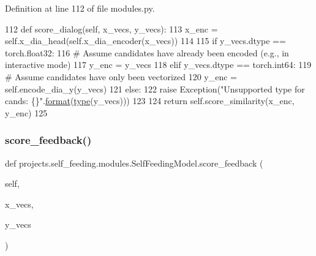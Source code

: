 Definition at line 112 of file modules.\+py.


\begin{DoxyCode}
112     \textcolor{keyword}{def }score\_dialog(self, x\_vecs, y\_vecs):
113         x\_enc = self.x\_dia\_head(self.x\_dia\_encoder(x\_vecs))
114 
115         \textcolor{keywordflow}{if} y\_vecs.dtype == torch.float32:
116             \textcolor{comment}{# Assume candidates have already been encoded (e.g., in interactive mode)}
117             y\_enc = y\_vecs
118         \textcolor{keywordflow}{elif} y\_vecs.dtype == torch.int64:
119             \textcolor{comment}{# Assume candidates have only been vectorized}
120             y\_enc = self.encode\_dia\_y(y\_vecs)
121         \textcolor{keywordflow}{else}:
122             \textcolor{keywordflow}{raise} Exception(\textcolor{stringliteral}{"Unsupported type for cands: \{\}"}.\hyperlink{namespaceparlai_1_1chat__service_1_1services_1_1messenger_1_1shared__utils_a32e2e2022b824fbaf80c747160b52a76}{format}(\hyperlink{namespaceparlai_1_1agents_1_1tfidf__retriever_1_1build__tfidf_ad5dfae268e23f506da084a9efb72f619}{type}(y\_vecs)))
123 
124         \textcolor{keywordflow}{return} self.score\_similarity(x\_enc, y\_enc)
125 
\end{DoxyCode}
\mbox{\label{classprojects_1_1self__feeding_1_1modules_1_1SelfFeedingModel_af2728f78dcc8352369756ab123a93469}} 
\subsubsection{\texorpdfstring{score\+\_\+feedback()}{score\_feedback()}}
{\footnotesize\ttfamily def projects.\+self\+\_\+feeding.\+modules.\+Self\+Feeding\+Model.\+score\+\_\+feedback (\begin{DoxyParamCaption}\item[{}]{self,  }\item[{}]{x\+\_\+vecs,  }\item[{}]{y\+\_\+vecs }\end{DoxyParamCaption})}




